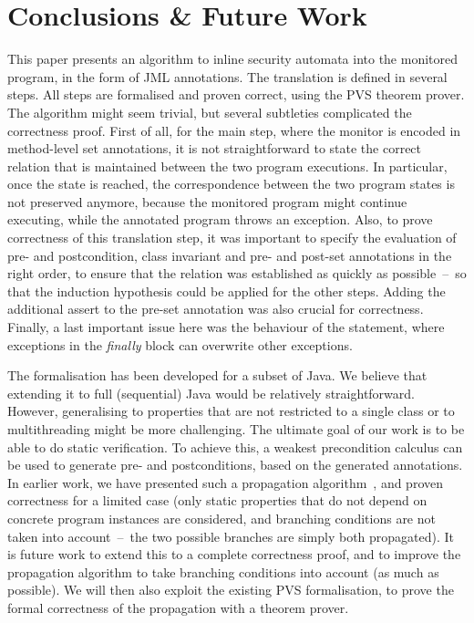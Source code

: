 \section{Conclusions \& Future Work }\label{SecConcl}

This paper presents an algorithm to inline security automata into the
monitored program, in the form of JML annotations. The translation is
defined in several steps. All steps are formalised and proven correct,
using the PVS theorem prover. The algorithm might seem trivial, but
several subtleties complicated the correctness proof. First of all,
for the main step, where the monitor is encoded in method-level set
annotations, it is not straightforward to state the correct relation
that is maintained between the two program executions. In particular,
once the \halted state is reached, the correspondence between the two
program states is not preserved anymore, because the monitored program
might continue executing, while the annotated program throws an
exception. Also, to prove correctness of this translation step, it was
important to specify the evaluation of pre- and postcondition, class
invariant and pre- and post-set annotations in the right order, to ensure
that the relation was established as quickly as possible~--~so that
the induction hypothesis could be applied for the other
steps. Adding the additional assert to the pre-set annotation was also
crucial for correctness.
Finally, a last important issue here was the behaviour of the
\TryCatch statement, where exceptions in the \emph{finally} block can
overwrite other exceptions.

The formalisation has been developed for a subset of Java. We believe
that extending it to full (sequential) Java would be relatively
straightforward. However, generalising to properties that are not
restricted to a single class or to multithreading might be more
challenging.
%
The ultimate goal of our work is to be able to do static
verification. To achieve this, a weakest precondition calculus can be
used to generate pre- and postconditions, based on the generated \Set
annotations. In earlier work, we have presented such a propagation
algorithm~\cite{PavlovaBBHL04}, and proven correctness for a limited
case (only static properties that do not depend on concrete program
instances are considered, and branching conditions are not taken into
account~--~the two possible branches are simply both propagated). It
is future work to extend this to a complete correctness proof, and to
improve the propagation algorithm to take branching conditions into
account (as much as possible). We will then also exploit the existing
PVS formalisation, to prove the formal correctness of the propagation
with a theorem prover.
